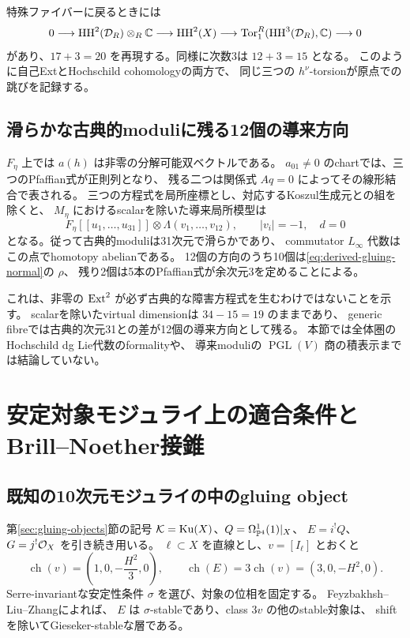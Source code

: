 特殊ファイバーに戻るときには
\[
 0\longrightarrow\operatorname{HH}^2(\mathcal D_R)\otimes_R\mathbb C
 \longrightarrow\operatorname{HH}^2(X)
 \longrightarrow\operatorname{Tor}_1^R(\operatorname{HH}^3(\mathcal D_R),\mathbb C)
 \longrightarrow0
\]
があり、$17+3=20$ を再現する。同様に次数3は $12+3=15$ となる。
このように自己ExtとHochschild cohomologyの両方で、
同じ三つの $h^{\nu}$-torsionが原点での跳びを記録する。

\subsection{滑らかな古典的moduliに残る12個の導来方向}

$F_\eta$ 上では $a(h)$ は非零の分解可能双ベクトルである。
$a_{01}\ne0$ のchartでは、三つのPfaffian式が正則列となり、
残る二つは関係式 $Aq=0$ によってその線形結合で表される。
三つの方程式を局所座標とし、対応するKoszul生成元との組を除くと、
$M_\eta$ におけるscalarを除いた導来局所模型は
\begin{equation}\label{eq:generic-gluing-derived}
 F_\eta[[u_1,\ldots,u_{31}]]\otimes\Lambda(v_1,\ldots,v_{12}),
 \qquad |v_i|=-1,\quad d=0
\end{equation}
となる。従って古典的moduliは31次元で滑らかであり、
commutator $L_\infty$ 代数はこの点でhomotopy abelianである。
12個の方向のうち10個は\eqref{eq:derived-gluing-normal}の $\rho$、
残り2個は5本のPfaffian式が余次元3を定めることによる。

これは、非零の $\operatorname{Ext}^2$ が必ず古典的な障害方程式を生むわけではないことを示す。
scalarを除いたvirtual dimensionは $34-15=19$ のままであり、
generic fibreでは古典的次元31との差が12個の導来方向として残る。
本節では全体圏のHochschild dg Lie代数のformalityや、
導来moduliの $\operatorname{PGL}(V)$ 商の積表示までは結論していない。


\section{安定対象モジュライ上の適合条件とBrill--Noether接錐}\label{sec:bn-algebraic}

\subsection{既知の10次元モジュライの中のgluing object}

第\ref{sec:gluing-objects}節の記号
$\mathcal K=\operatorname{Ku}(X)$、$Q=\Omega^1_{\mathbb P^4}(1)|_X$、
$E=i^!Q$、$G=j^!\mathcal O_X$ を引き続き用いる。
$\ell\subset X$ を直線とし、$v=[I_\ell]$ とおくと
\[
 \operatorname{ch}(v)=\left(1,0,-\frac{H^2}{3},0\right),\qquad
 \operatorname{ch}(E)=3\operatorname{ch}(v)=(3,0,-H^2,0).
\]
Serre-invariantな安定性条件 $\sigma$ を選び、対象の位相を固定する。
Feyzbakhsh--Liu--Zhang\cite[Section 3.2, Proposition 5.5]{FLZ}によれば、
$E$ は $\sigma$-stableであり、class $3v$ の他のstable対象は、
shiftを除いてGieseker-stableな層である。

